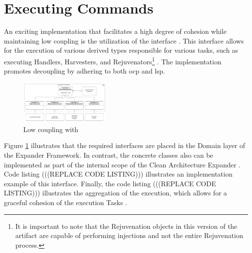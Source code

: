 \section{Executing Commands} \label{subsec_IExecutionInteractorObject}

An exciting implementation that facilitates a high degree of cohesion while maintaining
low coupling is the utilization of the  interface
\parencite{koks_iexecutioninteractor_2023}. This interface allows for the execution of
various derived types responsible for various tasks, such as executing Handlers,
Harvesters, and Rejuvenators\footnote{It is important to note that the Rejuvenation
objects in this version of the artifact are capable of performing injections and not the
entire Rejuvenation process.} \parencites{koks_expandentitieshandlerinteractor_2023,
koks_regionharvesterinteractor_2023, koks_regionrejuvenatorinteractor_2023}. The
implementation promotes decoupling by adhering to both \gls{ocp} and \gls{lsp}.

\begin{figure}[htbp]
    \centering
    \includegraphics[width=0.4\textwidth]{figures/command_pattern.pdf}
    \caption[Low coupling with ]{Low coupling with }
    \label{fig_iexecutioninteractor}
  \end{figure}


Figure \ref{fig_iexecutioninteractor} illustrates that the required interfaces are placed
in the Domain layer of the Expander Framework. In contrast, the concrete classes also can
be implemented as part of the internal scope of the Clean Architecture Expander
\parencite{koks_migrationharvesterinteractor_2023}. Code listing
(((REPLACE CODE LISTING))) illustrates an implementation example of
this interface. Finally, the code listing (((REPLACE CODE LISTING)))
illustrates the aggregation of the execution, which allows for a graceful cohesion of the
execution Tasks \parencite{koks_codegeneratorinteractor_2023}.

